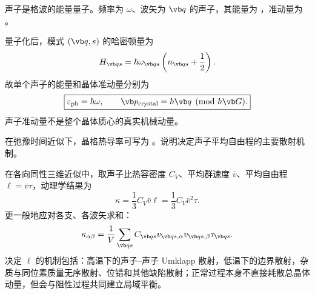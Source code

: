 \begin{question}
声子是格波的能量量子。频率为 $\omega$、波矢为 $\vb q$ 的声子，其能量为 \blank，准动量为 \blank。


\begin{solution}
量子化后，模式 $(\vb q,s)$ 的哈密顿量为
\[
 H_{\vb q s}=\hbar\omega_{\vb q s}
 \left(n_{\vb q s}+\frac12\right).
\]
故单个声子的能量和晶体准动量分别为
\[
 \boxed{\varepsilon_{\rm ph}=\hbar\omega,\qquad
 \vb p_{\rm crystal}=\hbar\vb q\pmod{\hbar\vb G}.}
\]
声子准动量不是整个晶体质心的真实机械动量。
\end{solution}
\end{question}

\begin{question}
在弛豫时间近似下，晶格热导率可写为 \blank。说明决定声子平均自由程的主要散射机制。


\begin{solution}
在各向同性三维近似中，取声子比热容密度 $C_V$、平均群速度 $\bar v$、平均自由程 $\ell=\bar v\tau$，动理学结果为
\[
 \boxed{\kappa=\frac13C_V\bar v\ell
 =\frac13C_V\bar v^2\tau.}
\]
更一般地应对各支、各波矢求和：
\[
 \kappa_{\alpha\beta}=\frac1V\sum_{\vb q s}
 C_{\vb q s}v_{\vb q s,\alpha}v_{\vb q s,\beta}\tau_{\vb q s}.
\]
决定 $\ell$ 的机制包括：高温下的声子--声子 Umklapp 散射，低温下的边界散射，杂质与同位素质量无序散射、位错和其他缺陷散射；正常过程本身不直接耗散总晶体动量，但会与阻性过程共同建立局域平衡。
\end{solution}
\end{question}

